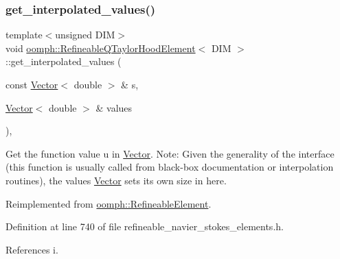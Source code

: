 \mbox{\label{classoomph_1_1RefineableQTaylorHoodElement_a0a7ccac13e54094a4e7b91c7eecaf223}} 
\subsubsection{\texorpdfstring{get\+\_\+interpolated\+\_\+values()}{get\_interpolated\_values()}\hspace{0.1cm}{\footnotesize\ttfamily [1/2]}}
{\footnotesize\ttfamily template$<$unsigned D\+IM$>$ \\
void \hyperlink{classoomph_1_1RefineableQTaylorHoodElement}{oomph\+::\+Refineable\+Q\+Taylor\+Hood\+Element}$<$ D\+IM $>$\+::get\+\_\+interpolated\+\_\+values (\begin{DoxyParamCaption}\item[{const \hyperlink{classoomph_1_1Vector}{Vector}$<$ double $>$ \&}]{s,  }\item[{\hyperlink{classoomph_1_1Vector}{Vector}$<$ double $>$ \&}]{values }\end{DoxyParamCaption})\hspace{0.3cm}{\ttfamily [inline]}, {\ttfamily [virtual]}}



Get the function value u in \hyperlink{classoomph_1_1Vector}{Vector}. Note\+: Given the generality of the interface (this function is usually called from black-\/box documentation or interpolation routines), the values \hyperlink{classoomph_1_1Vector}{Vector} sets its own size in here. 



Reimplemented from \hyperlink{classoomph_1_1RefineableElement_ad9a4f92880668a2373326d8306365c43}{oomph\+::\+Refineable\+Element}.



Definition at line 740 of file refineable\+\_\+navier\+\_\+stokes\+\_\+elements.\+h.



References i.

\mbox{\label{classoomph_1_1RefineableQTaylorHoodElement_ab6f15edf31d8e19c0324c72d636fa625}} 
